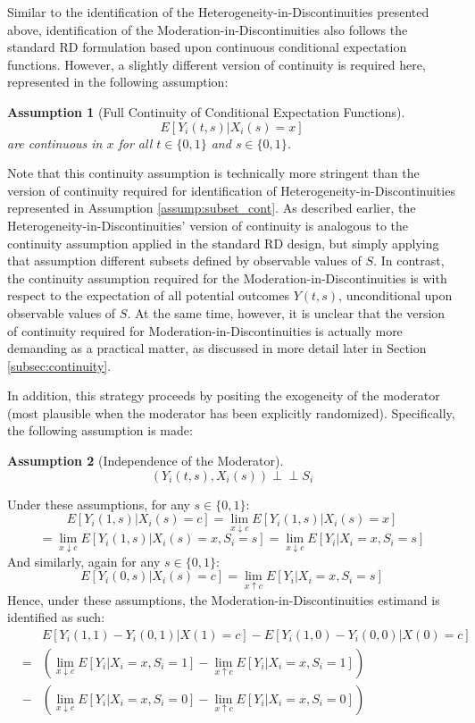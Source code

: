\documentclass[12pt]{article}
\newtheorem{assumption}{\small\sc Assumption}
\newcommand{\indep}{\perp\!\!\!\!\perp}
\begin{document}
Similar to the identification of the Heterogeneity-in-Discontinuities presented above, identification of the Moderation-in-Discontinuities also follows the standard RD formulation based upon continuous conditional expectation functions. However, a slightly different version of continuity is required here, represented in the following assumption:

\begin{assumption}[Full Continuity of Conditional Expectation Functions] \label{assump:full_cont}
$$E[Y_i(t,s) | X_i(s) = x]$$
are continuous in $x$ for all $t \in \{ 0, 1\}$ and $s \in \{ 0, 1\}$.
\end{assumption}

Note that this continuity assumption is technically more stringent than the version of continuity required for identification of Heterogeneity-in-Discontinuities represented in Assumption \ref{assump:subset_cont}. As described earlier, the Heterogeneity-in-Discontinuities' version of continuity is analogous to the continuity assumption applied in the standard RD design, but simply applying that assumption different subsets defined by observable values of $S$. In contrast, the continuity assumption required for the Moderation-in-Discontinuities is with respect to the expectation of all potential outcomes $Y(t,s)$, unconditional upon observable values of $S$. At the same time, however, it is unclear that the version of continuity required for Moderation-in-Discontinuities is actually more demanding as a practical matter, as discussed in more detail later in Section \ref{subsec:continuity}.

In addition, this strategy proceeds by positing the exogeneity of the moderator (most plausible when the moderator has been explicitly randomized). Specifically, the following assumption is made:

\begin{assumption}[Independence of the Moderator] \label{assump:mod_indep}
$$(Y_i(t,s), X_i(s)) \indep S_i$$
\end{assumption}

Under these assumptions, for any $s \in \{ 0,1 \}$:
$$E[Y_i(1,s) | X_i(s) = c] = \lim_{x \downarrow c} E[Y_i(1,s) | X_i(s) = x]$$
$$ = \lim_{x \downarrow c} E[Y_i(1,s) | X_i(s) = x, S_i = s] = \lim_{x \downarrow c} E[Y_i | X_i = x, S_i = s]$$
And similarly, again for any $s \in \{ 0,1 \}$:
$$E[Y_i(0,s) | X_i(s) = c] = \lim_{x \uparrow c} E[Y_i | X_i = x, S_i = s]$$
Hence, under these assumptions, the Moderation-in-Discontinuities estimand is identified as such:
\begin{eqnarray}
& & E[Y_i(1,1) - Y_i(0,1) | X(1)=c] - E[Y_i(1,0) - Y_i(0,0) | X(0)=c] \nonumber \\
& = & \left( \lim_{x \downarrow c} E[Y_i | X_i = x, S_i = 1] - \lim_{x \uparrow c} E[Y_i | X_i = x, S_i = 1] \right) \nonumber  \\
& - & \left( \lim_{x \downarrow c} E[Y_i | X_i = x, S_i = 0] - \lim_{x \uparrow c} E[Y_i | X_i = x, S_i = 0] \right) \label{rdd_mod_ideqn}
\end{eqnarray}
\end{document}
